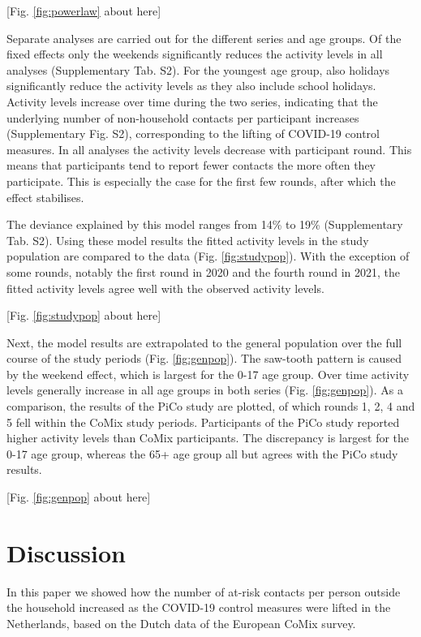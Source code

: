 \documentclass[fleqn,10pt]{wlscirep}
\begin{document}
[Fig. \ref{fig:powerlaw} about here]

Separate analyses are carried out for the different series and age groups. Of the fixed effects only the weekends significantly reduces the activity levels in all analyses (Supplementary Tab. S2). For the youngest age group, also holidays significantly reduce the activity levels as they also include school holidays. Activity levels increase over time during the two series, indicating that the underlying number of non-household contacts per participant increases (Supplementary Fig. S2), corresponding to the lifting of COVID-19 control measures. In all analyses the activity levels decrease with participant round. This means that participants tend to report fewer contacts the more often they participate. This is especially the case for the first few rounds, after which the effect stabilises.

The deviance explained by this model ranges from 14\% to 19\% (Supplementary Tab. S2). Using these model results the fitted activity levels in the study population are compared to the data (Fig. \ref{fig:studypop}). With the exception of some rounds, notably the first round in 2020 and the fourth round in 2021, the fitted activity levels agree well with the observed activity levels.

[Fig. \ref{fig:studypop} about here]

Next, the model results are extrapolated to the general population over the full course of the study periods (Fig. \ref{fig:genpop}). The saw-tooth pattern is caused by the weekend effect, which is largest for the 0-17 age group. Over time activity levels generally increase in all age groups in both series (Fig. \ref{fig:genpop}). As a comparison, the results of the PiCo study \cite{Backer_2021} are plotted, of which rounds 1, 2, 4 and 5 fell within the CoMix study periods. Participants of the PiCo study reported higher activity levels than CoMix participants. The discrepancy is largest for the 0-17 age group, whereas the 65+ age group all but agrees with the PiCo study results.

[Fig. \ref{fig:genpop} about here]

\section*{Discussion}

In this paper we showed how the number of at-risk contacts per person outside the household increased as the COVID-19 control measures were lifted in the Netherlands, based on the Dutch data of the European CoMix survey.
\end{document}
